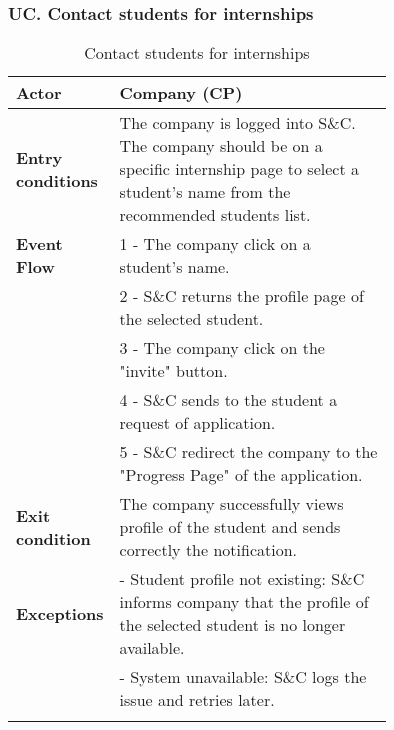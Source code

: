 \subsubsection*{UC\cuc . Contact students for internships}
\begin{center}
    \begin{longtable}{|l|p{0.75\linewidth}|}
        \hline
        \textbf{Actor}            & Company (CP)\\
        \hline
        \textbf{Entry conditions} & The company is logged into S\&C. The company should be on a specific internship page to select a student’s name from the recommended students list.\\
        \hline
        \textbf{Event Flow}     & 1 - The company click on a student's name. \\
                                & 2 - S\&C returns the profile page of the selected student. \\
                                & 3 - The company click on the "invite" button. \\
                                & 4 - S\&C sends to the student a request of application.\\
                                & 5 - S\&C redirect the company to the "Progress Page" of the application.\\
        \hline
        \textbf{Exit condition}     & The company successfully views profile of                                the student and sends correctly the notification.\\       
        \hline
        \textbf{Exceptions}     & - Student profile not existing: S\&C informs company that the profile of the selected student is no longer available. \\
                                & - System unavailable: S\&C logs the issue and retries later. \\
        \hline
        \caption{Contact students for internships}
        \label{tab: contact_students_for_internships_usecase}
    \end{longtable}
\end{center}

